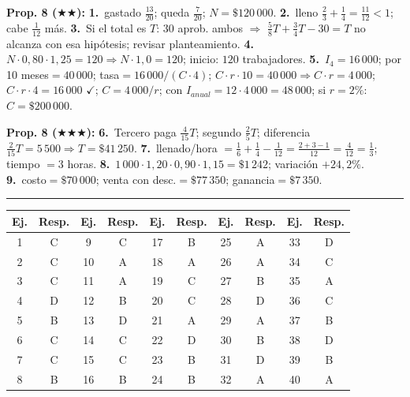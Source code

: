 \documentclass[11pt, letterpaper]{article}
\newcommand{\subbloque}[1]{%
  \vspace{14pt}
  \noindent{\large\bfseries\color{zenitnavy} #1}\par
  \vspace{4pt}\hrule height 1pt\vspace{8pt}}
\begin{document}
\textbf{Prop. 8 ($\bigstar\bigstar$):} \textbf{1.}~gastado $\tfrac{13}{20}$; queda $\tfrac{7}{20}$; $N=\$120\,000$. \quad \textbf{2.}~lleno $\tfrac{2}{3}+\tfrac{1}{4}=\tfrac{11}{12}<1$; cabe $\tfrac{1}{12}$ m\'as. \quad \textbf{3.}~Si el total es $T$: $30$ aprob. ambos $\Rightarrow$ $\tfrac{5}{8}T+\tfrac{3}{4}T-30=T$ no alcanza con esa hip\'otesis; revisar planteamiento. \quad \textbf{4.}~$N\cdot0{,}80\cdot1{,}25=120\Rightarrow N\cdot1{,}0=120$; inicio: $120$ trabajadores. \quad \textbf{5.}~$I_4=16\,000$; por 10 meses$=40\,000$; tasa$=16\,000/(C\cdot4)$; $C\cdot r\cdot10=40\,000\Rightarrow C\cdot r=4\,000$; $C\cdot r\cdot4=16\,000$ $\checkmark$; $C=4\,000/r$; con $I_{anual}=12\cdot4\,000=48\,000$; si $r=2\%$: $C=\$200\,000$.

\textbf{Prop. 8 ($\bigstar\bigstar\bigstar$):} \textbf{6.}~Tercero paga $\tfrac{4}{15}T$; segundo $\tfrac{2}{5}T$; diferencia $\tfrac{2}{15}T=5\,500\Rightarrow T=\$41\,250$. \quad \textbf{7.}~llenado/hora $=\tfrac{1}{6}+\tfrac{1}{4}-\tfrac{1}{12}=\tfrac{2+3-1}{12}=\tfrac{4}{12}=\tfrac{1}{3}$; tiempo $=3$ horas. \quad \textbf{8.}~$1\,000\cdot1{,}20\cdot0{,}90\cdot1{,}15=\$1\,242$; variaci\'on $+24{,}2\%$. \quad \textbf{9.}~costo$=\$70\,000$; venta con desc.$=\$77\,350$; ganancia$=\$7\,350$.

\subbloque{Ejercicios tipo PAES}

\begin{center}
\renewcommand{\arraystretch}{1.3}
\begin{tabular}{c|c||c|c||c|c||c|c||c|c}
\toprule
\textbf{Ej.} & \textbf{Resp.} & \textbf{Ej.} & \textbf{Resp.} & \textbf{Ej.} & \textbf{Resp.} & \textbf{Ej.} & \textbf{Resp.} & \textbf{Ej.} & \textbf{Resp.}\\
\midrule
1  & C & 9  & C & 17 & B & 25 & A & 33 & D\\
2  & C & 10 & A & 18 & A & 26 & A & 34 & C\\
3  & C & 11 & A & 19 & C & 27 & B & 35 & A\\
4  & D & 12 & B & 20 & C & 28 & D & 36 & C\\
5  & B & 13 & D & 21 & A & 29 & A & 37 & B\\
6  & C & 14 & C & 22 & D & 30 & B & 38 & D\\
7  & C & 15 & C & 23 & B & 31 & D & 39 & B\\
8  & B & 16 & B & 24 & B & 32 & A & 40 & A\\
\bottomrule
\end{tabular}
\end{center}
\end{document}
